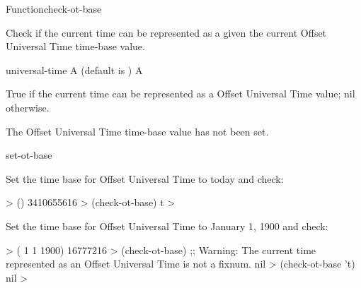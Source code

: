\documentclass[10pt,twoside,english,pdftex]{article}
\begin{document}

\begin{functiondoc}{Function}{check-ot-base}{
    \returns{} }

%

\fnsyntax

\fnpurpose Check if the current time can be represented as a
 given the current Offset Universal Time time-base
value.

\fnpackage {}

\fnmodule {}

\fnargs
\begin{args}{universal-time}
 A  (default is \nil)
\arg[boolean] A 
\end{args}

\fnreturns True if the current time can be represented as a
 Offset Universal Time value; nil otherwise.

\fnerrors The Offset Universal Time time-base value has not been set.

\begin{alsos}{set-ot-base}
\also[*ot-base*]
\also[ot2ut]
\also[ut2ot]
\end{alsos}

\fnexamples
Set the time base for Offset Universal Time to today and check:
%
\W\supp
\begin{example}
  > ()
  3410655616
  > (check-ot-base)
  t
  >
\end{example}
%
Set the time base for Offset Universal Time to January 1, 1900 and check:
%
\W\supp\notpretop
\begin{example}
  > ( 1 1 1900)
  16777216
  > (check-ot-base)
  ;; Warning: The current time represented as an Offset Universal Time is not a fixnum.
  nil
  > (check-ot-base 't)
  nil
  >
\end{example}

\end{functiondoc}

\end{document}
